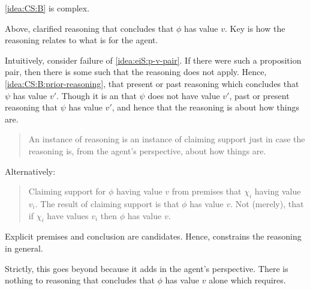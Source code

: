 \begin{note}
  \autoref{idea:CS:B} is complex.

  Above, clarified reasoning that concludes that \(\phi\) has value \(v\).
  Key is how the reasoning relates to what is \epAdv{} for the agent.

  Intuitively, consider failure of \ref{idea:eiS:p-v-pair}.
  If there were such a proposition pair, then there is some \ep{} such that the reasoning does not apply.
  Hence, \ref{idea:CS:B:prior-reasoning}, that present or past reasoning which concludes that \(\psi\) has value \(v'\).
  Though it is an \ep{} that \(\psi\) does not have value \(v'\), past or present reasoning  that \(\psi\) has value \(v'\), and hence that the reasoning is about how things are.

  \begin{quote}
    An instance of reasoning is an instance of claiming support just in case the reasoning is, from the agent's perspective, about how things are.
  \end{quote}

  Alternatively:

  \begin{quote}
    Claiming support for \(\phi\) having value \(v\) from premises that \(\chi_{i}\) having value \(v_{i}\).
    The result of claiming support is that \(\phi\) has value \(v\).
    Not (merely), that if \(\chi_{i}\) have values \(v_{i}\) then \(\phi\) has value \(v\).
  \end{quote}
\end{note}

\begin{note}
  Explicit premises and conclusion are candidates.
  Hence, \label{idea:CS:B:step:commit} constrains the reasoning in general.
\end{note}

\begin{note}
  Strictly, this goes beyond because it adds in the agent's perspective.
  There is nothing to reasoning that concludes that \(\phi\) has value \(v\) alone which requires.
\end{note}


